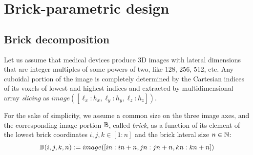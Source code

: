 
\section{Brick-parametric design}\label{sec:filter}

\subsection{Brick decomposition}\label{sec:brick-decomposition}

Let us assume that medical devices produce 3D images with lateral dimensions that are integer multiples of some powers of two, like 128, 256, 512, etc.
Any cuboidal portion of the image is completely determined by the Cartesian indices of its voxels of lowest and highest indices and extracted by multidimensional array \emph{slicing} as $image([\ell_x : h_x, \ell_y : h_y, \ell_z : h_z])$.

For the sake of simplicity, we assume a common size on the three image axes, and the corresponding image portion $\mathbb{B}$, called \emph{brick}, as a function of its element of the  lowest  brick coordinates $i,j,k\in [1:n]$ and the brick lateral size $n\in\mathbb{N}$:
\[
\mathbb{B}(i,j,k,n) := image([in:in+n, jn:jn+n, kn:kn+n]) 
\]

